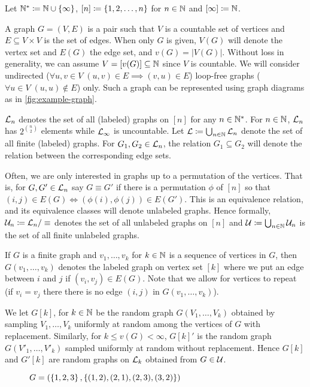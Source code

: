 \documentclass{article}
\begin{document}
Let $\N* \coloneqq \N \cup \set{\infty}$, $[n] \coloneqq \left\{ 1,2,\dots,n \right\}$ for $n \in \N$ and $[\infty] \coloneqq \N$.

A graph $G=(V,E)$ is a pair such that $V$ is a countable set of vertices and $E \subseteq V \times V$ is the set of edges. 
When only $G$ is given, $V(G)$ will denote the vertex set and $E(G)$ the edge set, and $v(G) = |V(G)|$. Without loss in generality, we can assume $V = [v(G)] \subseteq \N$ since $V$ is countable. We will consider undirected ($\forall u,v \in V \; (u,v) \in E \implies (v,u) \in E$) loop-free graphs ($\forall u \in V \; (u,u) \notin E$) only. Such a graph can be represented using graph diagrams as in \autoref{fig:example-graph}. 

$\Lg_{n}$ denotes the set of all (labeled) graphs on $[n]$ for any $n \in \N*$. For $n \in \N$, $\Lg_{n}$ has $2^{\binom{n}{2}}$ elements while $\Lg_{\infty}$ is uncountable. Let $\Lg \coloneqq \bigcup_{n \in \N} \Lg_{n}$ denote the set of all finite (labeled) graphs.
For $G_1, G_2 \in \Lg_{n}$, the relation $G_1 \subseteq G_2$ will denote the relation between the corresponding edge sets. 

Often, we are only interested in graphs up to a permutation of the vertices. That is, for $G, G' \in \Lg_{n}$ say $G \equiv G'$ if there is a permutation $\phi$ of $[n]$ so that $(i,j) \in E(G) \iff (\phi(i),\phi(j)) \in E(G')$. This is an equivalence relation, and its equivalence classes will denote unlabeled graphs. Hence formally, $\Ug_{n} \coloneqq \Lg_{n}/\equiv$ denotes the set of all unlabeled graphs on $[n]$ and $\Ug \coloneqq \bigcup_{n \in \N} \Ug_{n}$ is the set of all finite unlabeled graphs.

If $G$ is a finite graph and $v_1,\dots,v_k$ for $k \in \N$ is a sequence of vertices in $G$, then $G(v_1,\dots,v_k)$ denotes the labeled graph on vertex set $[k]$ where we put an edge between $i$ and $j$ if $(v_i, v_j) \in E(G)$. Note that we allow for vertices to repeat (if $v_i = v_j$ there there is no edge $(i, j)$ in $G(v_1, \dots, v_k)$).

We let $G[k]$, for $k \in \N$ be the random graph $G(V_1,\dots,V_k)$ obtained by sampling $V_1,\dots,V_k$ uniformly at random among the vertices of $G$ with replacement. Similarly, for $k \leq v(G) < \infty$, $G[k]'$ is the random graph $G(V'_1,\dots,V'_k)$ sampled uniformly at random without replacement. Hence $G[k]$ and $G'[k]$ are random graphs on $\Lg_{k}$ obtained from $G \in \Ug$. 


\begin{figure}
  \centering
  \caption{$G=(\left\{ 1, 2, 3 \right\}, \left\{ (1,2), (2,1), (2,3), (3,2) \right\})$}
  \label{fig:example-graph}
\end{figure}
\end{document}
